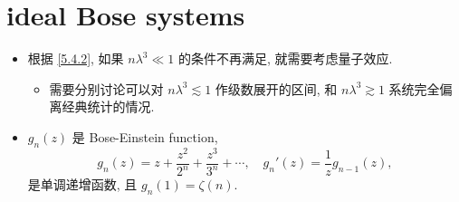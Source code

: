\chapter{ideal Bose systems}
\begin{itemize}
	\item 根据 \eqref{5.4.2}, 如果 $n \lambda^3 \ll 1$ 的条件不再满足, 就需要考虑量子效应.
	\begin{itemize}
		\item 需要分别讨论可以对 $n \lambda^3 \lesssim 1$ 作级数展开的区间, 和 $n \lambda^3 \gtrsim 1$ 系统完全偏离经典统计的情况.
	\end{itemize}
	
	\item $g_n(z)$ 是 Bose-Einstein function,
	\begin{equation}
		g_n(z) = z + \frac{z^2}{2^n} + \frac{z^3}{3^n} + \cdots, \quad g_n'(z) = \frac{1}{z} g_{n - 1}(z),
	\end{equation}
	是单调递增函数, 且 $g_n(1) = \zeta(n)$.
\end{itemize}

